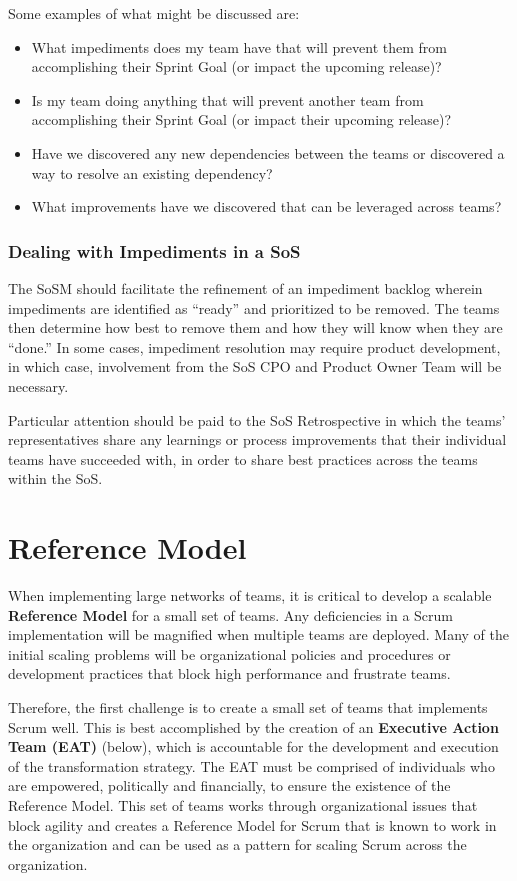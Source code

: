 \documentclass[12pt,a4paper,parskip=full]{scrartcl}
\begin{document}
Some examples of what might be discussed are:
\begin{itemize}
	\item What impediments does my team have that will prevent them from accomplishing their Sprint Goal (or impact the upcoming release)?
	\item Is my team doing anything that will prevent another team from accomplishing their Sprint Goal (or impact their upcoming release)?
	\item Have we discovered any new dependencies between the teams or discovered a way to resolve an existing dependency?
	\item What improvements have we discovered that can be leveraged across teams?
\end{itemize}

\subsubsection{Dealing with Impediments in a SoS}

The SoSM should facilitate the refinement of an impediment backlog wherein impediments are identified as ``ready'' and prioritized to be removed. The teams then determine how best to remove them and how they will know when they are ``done.'' In some cases, impediment resolution may require product development, in which case, involvement from the SoS CPO and Product Owner Team will be necessary.

Particular attention should be paid to the SoS Retrospective in which the teams' representatives share any learnings or process improvements that their individual teams have succeeded with, in order to share best practices across the teams within the SoS.  

\section{Reference Model}

When implementing large networks of teams, it is critical to develop a scalable \textbf{Reference Model} for a small set of teams. Any deficiencies in a Scrum implementation will be magnified when multiple teams are deployed. Many of the initial scaling problems will be organizational policies and procedures or development practices that block high performance and frustrate teams. 

Therefore, the first challenge is to create a small set of teams that implements Scrum well.  This is best accomplished by the creation of an \textbf{Executive Action Team (EAT)} (below), which is accountable for the development and execution of the transformation strategy.  The EAT must be comprised of individuals who are empowered, politically and financially, to ensure the existence of the Reference Model. This set of teams works through organizational issues that block agility and creates a Reference Model for Scrum that is known to work in the organization and can be used as a pattern for scaling Scrum across the organization.
\end{document}
